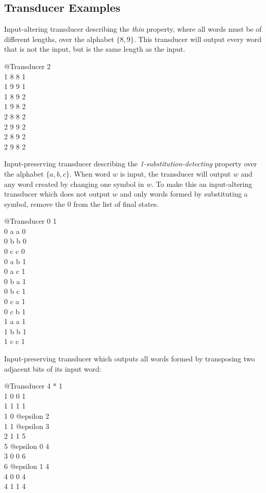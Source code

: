 \documentclass{article}
\begin{document}
\subsection{Transducer Examples}
Input-altering transducer describing the \textit{thin} property, where all words must be of different lengths, over the alphabet $\{8, 9\}$. This transducer will output every word that is not the input, but is the same length as the input.
\raggedright
\begin{center}
@Transducer 2\\1 8 8 1\\1 9 9 1\\1 8 9 2\\1 9 8 2\\2 8 8 2\\2 9 9 2\\2 8 9 2\\2 9 8 2\\
\end{center}
Input-preserving transducer describing the \textit{1-substitution-detecting} property over the alphabet $\{a, b, c\}$. When word $w$ is input, the transducer will output $w$ and any word created by changing one symbol in $w$. To make this an input-altering transducer which does not output $w$ and only words formed by substituting a symbol, remove the 0 from the list of final states.
\begin{center}
@Transducer 0 1\\0 a a 0\\0 b b 0\\0 c c 0\\0 a b 1\\0 a c 1\\0 b a 1\\0 b c 1\\0 c a 1\\0 c b 1\\1 a a 1\\1 b b 1\\1 c c 1\\
\end{center}

Input-preserving transducer which outputs all words formed by transposing two adjacent bits of its input word:
\begin{center}
@Transducer 4 * 1\\1 0 0 1\\1 1 1 1\\1 0 @epsilon 2\\1 1 @epsilon 3\\2 1 1 5\\5 @epsilon 0 4\\3 0 0 6\\6 @epsilon 1 4\\4 0 0 4\\4 1 1 4\\
\end{center}
\end{document}
